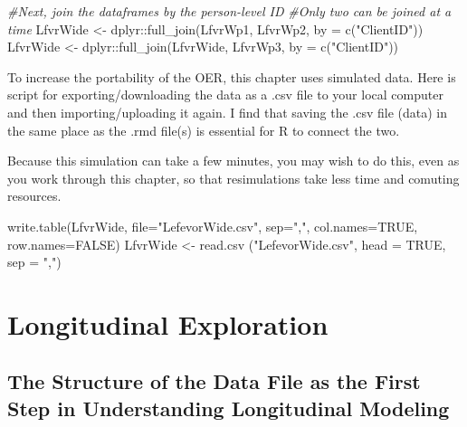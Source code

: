 \documentclass[
  11pt,
]{book}
\newenvironment{Shaded}{\begin{snugshade}}{\end{snugshade}}
\newcommand{\AttributeTok}[1]{\textcolor[rgb]{0.77,0.63,0.00}{#1}}
\newcommand{\CommentTok}[1]{\textcolor[rgb]{0.56,0.35,0.01}{\textit{#1}}}
\newcommand{\ConstantTok}[1]{\textcolor[rgb]{0.00,0.00,0.00}{#1}}
\newcommand{\FunctionTok}[1]{\textcolor[rgb]{0.00,0.00,0.00}{#1}}
\newcommand{\NormalTok}[1]{#1}
\newcommand{\OtherTok}[1]{\textcolor[rgb]{0.56,0.35,0.01}{#1}}
\newcommand{\SpecialCharTok}[1]{\textcolor[rgb]{0.00,0.00,0.00}{#1}}
\newcommand{\StringTok}[1]{\textcolor[rgb]{0.31,0.60,0.02}{#1}}
\begin{document}
\begin{Shaded}
\begin{Highlighting}[]
\CommentTok{\#Next, join the dataframes by the person{-}level ID}
\CommentTok{\#Only two can be joined at a time}
\NormalTok{LfvrWide }\OtherTok{\textless{}{-}}\NormalTok{ dplyr}\SpecialCharTok{::}\FunctionTok{full\_join}\NormalTok{(LfvrWp1, LfvrWp2, }\AttributeTok{by =} \FunctionTok{c}\NormalTok{(}\StringTok{"ClientID"}\NormalTok{))}
\NormalTok{LfvrWide }\OtherTok{\textless{}{-}}\NormalTok{ dplyr}\SpecialCharTok{::}\FunctionTok{full\_join}\NormalTok{(LfvrWide, LfvrWp3,  }\AttributeTok{by =} \FunctionTok{c}\NormalTok{(}\StringTok{"ClientID"}\NormalTok{))}
\end{Highlighting}
\end{Shaded}

To increase the portability of the OER, this chapter uses simulated data. Here is script for exporting/downloading the data as a .csv file to your local computer and then importing/uploading it again. I find that saving the .csv file (data) in the same place as the .rmd file(s) is essential for R to connect the two.

Because this simulation can take a few minutes, you may wish to do this, even as you work through this chapter, so that resimulations take less time and comuting resources.

\begin{Shaded}
\begin{Highlighting}[]
\FunctionTok{write.table}\NormalTok{(LfvrWide, }\AttributeTok{file=}\StringTok{"LefevorWide.csv"}\NormalTok{, }\AttributeTok{sep=}\StringTok{","}\NormalTok{, }\AttributeTok{col.names=}\ConstantTok{TRUE}\NormalTok{, }\AttributeTok{row.names=}\ConstantTok{FALSE}\NormalTok{)}
\NormalTok{LfvrWide }\OtherTok{\textless{}{-}} \FunctionTok{read.csv}\NormalTok{ (}\StringTok{"LefevorWide.csv"}\NormalTok{, }\AttributeTok{head =} \ConstantTok{TRUE}\NormalTok{, }\AttributeTok{sep =} \StringTok{","}\NormalTok{)}
\end{Highlighting}
\end{Shaded}

\hypertarget{longitudinal-exploration}{%
\section{Longitudinal Exploration}\label{longitudinal-exploration}}

\hypertarget{the-structure-of-the-data-file-as-the-first-step-in-understanding-longitudinal-modeling}{%
\subsection{The Structure of the Data File as the First Step in Understanding Longitudinal Modeling}\label{the-structure-of-the-data-file-as-the-first-step-in-understanding-longitudinal-modeling}}
\end{document}
